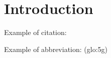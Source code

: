 \chapter*{Introduction}
\setcounter{page}{11}

Example of citation:
\cite{basics_gps}

Example of abbreviation:
(\acrshort{glo:5g})
